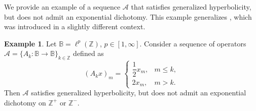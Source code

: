 \documentclass[12pt]{article}
\newcommand{\Bb}{\mathbb{B}}
\newcommand{\Zz}{\mathbb{Z}}
\theoremstyle{definition}
\newtheorem{example}[thm]{Example}
\begin{document}
We provide an example of a sequence $\mathcal{A}$ that satisfies generalized hyperbolicity, but does not admit an exponential dichotomy. This example generalizes \cite[Example 1.13]{PilBook}, which was introduced in a slightly different context.
\begin{example}\label{ex:CL-not-ED}
    Let $\Bb = \ell^p(\Zz)$, $p \in [1, \infty]$. Consider a sequence of operators $\mathcal{A} = \{A_k: \Bb \to \Bb\}_{k \in \Zz}$ defined as
    $$
(A_k x)_m =
\begin{cases}
\dfrac{1}{2} x_m, & m \leq k, \\
2 x_m, & m > k.
\end{cases}    
    $$
    Then $\mathcal{A}$ satisfies generalized hyperbolicity, but does not admit an exponential dichotomy on $\Zz^+$ or $\Zz^-$.
\end{example}
\end{document}
